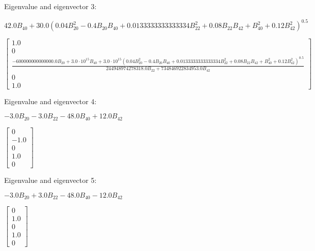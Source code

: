 \documentclass[8pt]{report}
\begin{document}
Eigenvalue and eigenvector 3:

\begin{math}
42.0 B_{40} + 30.0 \left(0.04 B_{20}^{2} - 0.4 B_{20} B_{40} + 0.0133333333333334 B_{22}^{2} + 0.08 B_{22} B_{42} + B_{40}^{2} + 0.12 B_{42}^{2}\right)^{0.5}
\end{math}

\begin{math}
\left[\begin{matrix}1.0\\0\\\frac{- 600000000000000.0 B_{20} + 3.0 \cdot 10^{15} B_{40} + 3.0 \cdot 10^{15} \left(0.04 B_{20}^{2} - 0.4 B_{20} B_{40} + 0.0133333333333334 B_{22}^{2} + 0.08 B_{22} B_{42} + B_{40}^{2} + 0.12 B_{42}^{2}\right)^{0.5}}{244948974278318.0 B_{22} + 734846922834953.0 B_{42}}\\0\\1.0\end{matrix}\right]
\end{math}

Eigenvalue and eigenvector 4:

\begin{math}
- 3.0 B_{20} - 3.0 B_{22} - 48.0 B_{40} + 12.0 B_{42}
\end{math}

\begin{math}
\left[\begin{matrix}0\\-1.0\\0\\1.0\\0\end{matrix}\right]
\end{math}

Eigenvalue and eigenvector 5:

\begin{math}
- 3.0 B_{20} + 3.0 B_{22} - 48.0 B_{40} - 12.0 B_{42}
\end{math}

\begin{math}
\left[\begin{matrix}0\\1.0\\0\\1.0\\0\end{matrix}\right]
\end{math}
\end{document}
